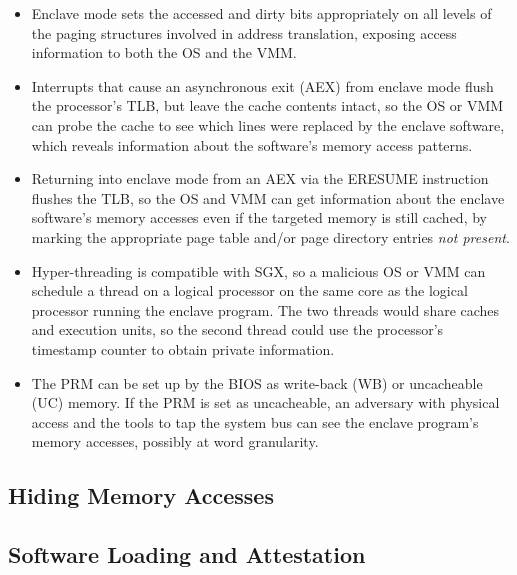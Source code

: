 \begin{itemize}

\item Enclave mode sets the accessed and dirty bits appropriately on all levels
      of the paging structures involved in address translation, exposing access
      information to both the OS and the VMM.

\item Interrupts that cause an asynchronous exit (AEX) from enclave mode flush
      the processor's TLB, but leave the cache contents intact, so the OS or
      VMM can probe the cache to see which lines were replaced by the enclave
      software, which reveals information about the software's memory access
      patterns.

\item Returning into enclave mode from an AEX via the ERESUME instruction
      flushes the TLB, so the OS and VMM can get information about the enclave
      software's memory accesses even if the targeted memory is still cached,
      by marking the appropriate page table and/or page directory entries
      \textit{not present}.

\item Hyper-threading is compatible with SGX, so a malicious OS or VMM can
      schedule a thread on a logical processor on the same core as the logical
      processor running the enclave program. The two threads would share
      caches and execution units, so the second thread could use the
      processor's timestamp counter \cite{petters1999making} to obtain private
      information.

\item The PRM can be set up by the BIOS as write-back (WB) or uncacheable (UC)
      memory. If the PRM is set as uncacheable, an adversary with physical
      access and the tools to tap the system bus can see the enclave program's
      memory accesses, possibly at word granularity.

\end{itemize}



\subsection{Hiding Memory Accesses}


\subsection{Software Loading and Attestation}

